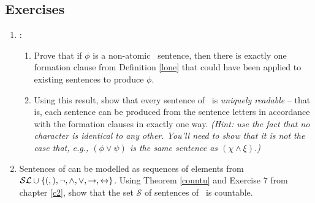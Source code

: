 	
	{\small


\subsection*{Exercises}


\begin{enumerate}
	\item  \citealp[\S 2]{sep-logic-classical}: \begin{enumerate}
		\item Prove that if $\phi$ is a non-atomic \lone\ sentence, then there is exactly one formation clause from Definition \ref{lone} that could have been applied to existing sentences to produce $\phi$. 
		\item Using this result, show that every sentence of \lone\ is \emph{uniquely readable} – that is, each sentence can be produced from the sentence letters in accordance with the formation clauses in exactly one way. \emph{(Hint: use the fact that no character is identical to any other. You'll need to show that it is not the case that, e.g., $(\phi \vee \psi)$ is the same sentence as $(\chi \wedge \xi)$.)}
	\end{enumerate}
	 
	\item Sentences of \lone can be modelled as sequences of elements from $\mathcal{SL} \cup \{(,),\neg,\wedge,\vee,\to,\leftrightarrow\}$. Using Theorem \ref{countu} and Exercise 7  from chapter \ref{c2}, show that the set $\mathcal{S}$ of sentences of \lone\ is countable. 
	
\end{enumerate}

}


